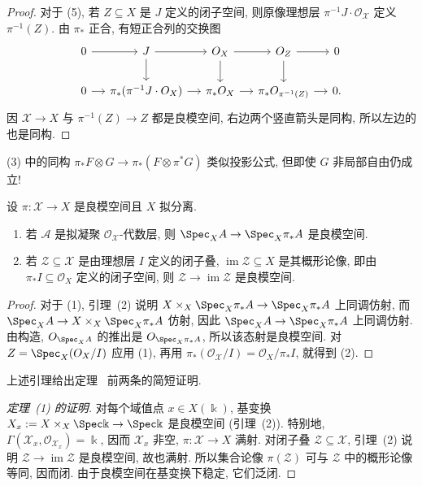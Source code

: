 \begin{proof}
对于 (5), 若 $Z\subseteq X$ 是 $J$ 定义的闭子空间, 则原像理想层 $\pi^{-1}J\cdot\mathcal O_{\mathcal X}$ 定义 $\pi^{-1}(Z)$. 由 $\pi_*$ 正合, 有短正合列的交换图
\begin{align*}
\begin{tikzcd}[ampersand replacement=\&,column sep=small]
0\arrow[r]\&J\arrow[r]\arrow[d]\&\mathcal O_X\arrow[r]\arrow[d]\&\mathcal O_Z\arrow[r]\arrow[d]\&0\\
0\arrow[r]\&\pi_*(\pi^{-1}J\cdot\mathcal O_{\mathcal X})\arrow[r]\&\pi_*\mathcal O_{\mathcal X}\arrow[r]\&\pi_*\mathcal O_{\pi^{-1}(Z)}\arrow[r]\&0.
\end{tikzcd}
\end{align*}
因 $\mathcal X\to X$ 与 $\pi^{-1}(Z)\to Z$ 都是良模空间, 右边两个竖直箭头是同构, 所以左边的也是同构.
\end{proof}
\begin{remark}\label{src:7.5.25}
(3) 中的同构 $\pi_*F\otimes G\to\pi_*(F\otimes\pi^*G)$ 类似投影公式, 但即使 $G$ 非局部自由仍成立!
\end{remark}
\begin{lemma}\label{src:7.5.26}
设 $\pi:\mathcal X\to X$ 是良模空间且 $X$ 拟分离.
\begin{enumerate}[(1)]
\item 若 $\mathcal A$ 是拟凝聚 $\mathcal O_{\mathcal X}$-代数层, 则 $\Spec_{\mathcal X}\mathcal A\to\Spec_X\pi_*\mathcal A$ 是良模空间.
\item 若 $\mathcal Z\subseteq\mathcal X$ 是由理想层 $I$ 定义的闭子叠, $\operatorname{im}\mathcal Z\subseteq X$ 是其概形论像, 即由 $\pi_*I\subseteq\mathcal O_X$ 定义的闭子空间, 则 $\mathcal Z\to\operatorname{im}\mathcal Z$ 是良模空间.
\end{enumerate}
\end{lemma}
\begin{proof}
对于 (1), 引理~(2) 说明 $\mathcal X\times_X\Spec_X\pi_*\mathcal A\to\Spec_X\pi_*\mathcal A$ 上同调仿射, 而 $\Spec_{\mathcal X}\mathcal A\to\mathcal X\times_X\Spec_X\pi_*\mathcal A$ 仿射, 因此 $\Spec_{\mathcal X}\mathcal A\to\Spec_X\pi_*\mathcal A$ 上同调仿射. 由构造, $\mathcal O_{\Spec_{\mathcal X}\mathcal A}$ 的推出是 $\mathcal O_{\Spec_X\pi_*\mathcal A}$, 所以该态射是良模空间. 对 $\mathcal Z=\Spec_{\mathcal X}(\mathcal O_{\mathcal X}/I)$ 应用 (1), 再用 $\pi_*(\mathcal O_{\mathcal X}/I)=\mathcal O_X/\pi_*I$, 就得到 (2).
\end{proof}
上述引理给出定理~ 前两条的简短证明.
\begin{proof}[定理~(1) 的证明]
对每个域值点 $x\in X(\Bbbk)$, 基变换 $\mathcal X_x:=\mathcal X\times_X\Spec\Bbbk\to\Spec\Bbbk$ 是良模空间 (引理~(2)). 特别地, $\Gamma(\mathcal X_x,\mathcal O_{\mathcal X_x})=\Bbbk$, 因而 $\mathcal X_x$ 非空, $\pi:\mathcal X\to X$ 满射. 对闭子叠 $\mathcal Z\subseteq\mathcal X$, 引理~(2) 说明 $\mathcal Z\to\operatorname{im}\mathcal Z$ 是良模空间, 故也满射. 所以集合论像 $\pi(\mathcal Z)$ 可与 $\mathcal Z$ 中的概形论像等同, 因而闭. 由于良模空间在基变换下稳定, 它们泛闭.
\end{proof}
